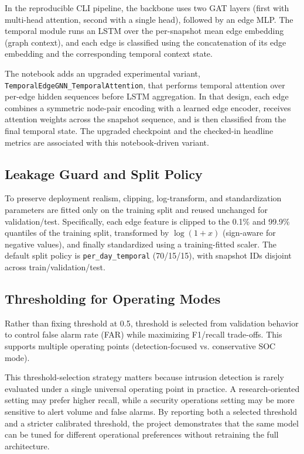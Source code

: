 \documentclass[conference]{IEEEtran}
\begin{document}
In the reproducible CLI pipeline, the backbone uses two GAT layers (first with multi-head attention, second with a single head), followed by an edge MLP. The temporal module runs an LSTM over the per-snapshot mean edge embedding (graph context), and each edge is classified using the concatenation of its edge embedding and the corresponding temporal context state.

The notebook adds an upgraded experimental variant, \texttt{TemporalEdgeGNN\_TemporalAttention}, that performs temporal attention over per-edge hidden sequences before LSTM aggregation. In that design, each edge combines a symmetric node-pair encoding with a learned edge encoder, receives attention weights across the snapshot sequence, and is then classified from the final temporal state. The upgraded checkpoint and the checked-in headline metrics are associated with this notebook-driven variant.

\subsection{Leakage Guard and Split Policy}
To preserve deployment realism, clipping, log-transform, and standardization parameters are fitted only on the training split and reused unchanged for validation/test. Specifically, each edge feature is clipped to the 0.1\% and 99.9\% quantiles of the training split, transformed by $\log(1+x)$ (sign-aware for negative values), and finally standardized using a training-fitted scaler. The default split policy is \texttt{per\_day\_temporal} (70/15/15), with snapshot IDs disjoint across train/validation/test.

\subsection{Thresholding for Operating Modes}
Rather than fixing threshold at 0.5, threshold is selected from validation behavior to control false alarm rate (FAR) while maximizing F1/recall trade-offs. This supports multiple operating points (detection-focused vs. conservative SOC mode).

This threshold-selection strategy matters because intrusion detection is rarely evaluated under a single universal operating point in practice. A research-oriented setting may prefer higher recall, while a security operations setting may be more sensitive to alert volume and false alarms. By reporting both a selected threshold and a stricter calibrated threshold, the project demonstrates that the same model can be tuned for different operational preferences without retraining the full architecture.
\end{document}
